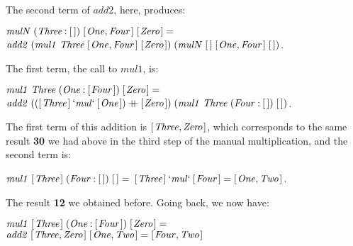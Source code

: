 \documentclass{scrreprt}
\newcommand{\Conid}[1]{\mathit{#1}}
\newcommand{\Varid}[1]{\mathit{#1}}
\newcommand{\plus}{\mathbin{+\!\!\!+}}
\begin{document}
The second term of \ensuremath{\Varid{add2}}, here, produces:

\begin{minipage}{\textwidth}
\ensuremath{\Varid{mulN}\;(\Conid{Three}\mathbin{:}[\mskip1.5mu \mskip1.5mu])\;[\mskip1.5mu \Conid{One},\Conid{Four}\mskip1.5mu]\;[\mskip1.5mu \Conid{Zero}\mskip1.5mu]\mathrel{=}}\\
\ensuremath{\Varid{add2}\;(\Varid{mul1}\;\Conid{Three}\;[\mskip1.5mu \Conid{One},\Conid{Four}\mskip1.5mu]\;[\mskip1.5mu \Conid{Zero}\mskip1.5mu])\;(\Varid{mulN}\;[\mskip1.5mu \mskip1.5mu]\;[\mskip1.5mu \Conid{One},\Conid{Four}\mskip1.5mu]\;[\mskip1.5mu \mskip1.5mu])}.
\end{minipage}

The first term, the call to \ensuremath{\Varid{mul1}}, is:

\begin{minipage}{\textwidth}
\ensuremath{\Varid{mul1}\;\Conid{Three}\;(\Conid{One}\mathbin{:}[\mskip1.5mu \Conid{Four}\mskip1.5mu])\;[\mskip1.5mu \Conid{Zero}\mskip1.5mu]\mathrel{=}}\\
\ensuremath{\Varid{add2}\;(([\mskip1.5mu \Conid{Three}\mskip1.5mu]\mathbin{`\Varid{mul}`}[\mskip1.5mu \Conid{One}\mskip1.5mu])\plus [\mskip1.5mu \Conid{Zero}\mskip1.5mu])\;(\Varid{mul1}\;\Conid{Three}\;(\Conid{Four}\mathbin{:}[\mskip1.5mu \mskip1.5mu])\;[\mskip1.5mu \mskip1.5mu])}.
\end{minipage}

The first term of this addition is \ensuremath{[\mskip1.5mu \Conid{Three},\Conid{Zero}\mskip1.5mu]},
which corresponds to the same result \textbf{30}
we had above in the third step of the manual multiplication,
and the second term is:

\begin{minipage}{\textwidth}
\ensuremath{\Varid{mul1}\;[\mskip1.5mu \Conid{Three}\mskip1.5mu]\;(\Conid{Four}\mathbin{:}[\mskip1.5mu \mskip1.5mu])\;[\mskip1.5mu \mskip1.5mu]\mathrel{=}}
\ensuremath{[\mskip1.5mu \Conid{Three}\mskip1.5mu]\mathbin{`\Varid{mul}`}[\mskip1.5mu \Conid{Four}\mskip1.5mu]\mathrel{=}[\mskip1.5mu \Conid{One},\Conid{Two}\mskip1.5mu]}.
\end{minipage}

The result \textbf{12} we obtained before.
Going back, we now have:

\begin{minipage}{\textwidth}
\ensuremath{\Varid{mul1}\;[\mskip1.5mu \Conid{Three}\mskip1.5mu]\;(\Conid{One}\mathbin{:}[\mskip1.5mu \Conid{Four}\mskip1.5mu])\;[\mskip1.5mu \Conid{Zero}\mskip1.5mu]\mathrel{=}}\\
\ensuremath{\Varid{add2}\;[\mskip1.5mu \Conid{Three},\Conid{Zero}\mskip1.5mu]\;[\mskip1.5mu \Conid{One},\Conid{Two}\mskip1.5mu]\mathrel{=}[\mskip1.5mu \Conid{Four},\Conid{Two}\mskip1.5mu]}
\end{minipage}
\end{document}
